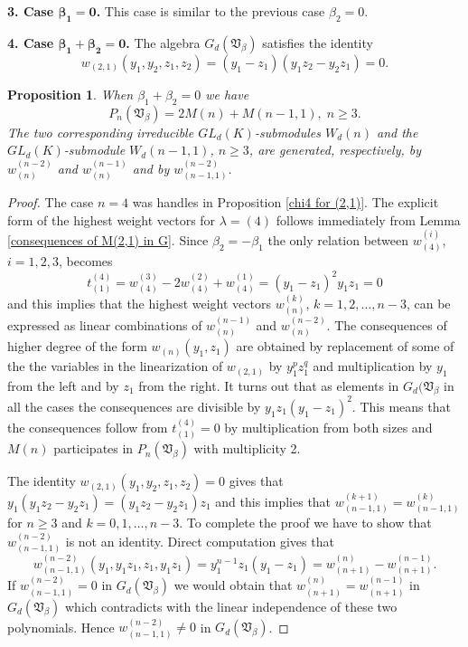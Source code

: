 \documentclass{amsart}
\newtheorem{proposition}[theorem]{Proposition}
\theoremstyle{definition}
\begin{document}
{\bf 3. Case $\bm{\beta_1=0}$.} This case is similar to the previous case $\beta_2=0$.

{\bf 4. Case $\bm{\beta_1+\beta_2=0}$.} The algebra $G_d({\mathfrak V}_{\beta})$ satisfies the identity
\[
w_{(2,1)}(y_1,y_2,z_1,z_2)=(y_1-z_1)(y_1z_2-y_2z_1)=0.
\]

\begin{proposition}\label{chi for beta1=beta2}
When $\beta_1+\beta_2=0$ we have
\[
P_n({\mathfrak V}_{\beta})=2M(n)+M(n-1,1),\; n\geq 3.
\]
The two corresponding irreducible $GL_d(K)$-submodules $W_d(n)$ and the $GL_d(K)$-submodule $W_d(n-1,1)$, $n\geq 3$, are generated, respectively, by
$w_{(n)}^{(n-2)}$ and $w_{(n)}^{(n-1)}$ and by $w_{(n-1,1)}^{(n-2)}$.
\end{proposition}

\begin{proof}
The case $n=4$ was handles in Proposition \ref{chi4 for (2,1)}. The explicit form of the highest weight vectors for $\lambda=(4)$ follows immediately
from Lemma \ref{consequences of M(2,1) in G}.
Since $\beta_2=-\beta_1$ the only relation between $w_{(4)}^{(i)}$, $i=1,2,3$, becomes
\[
t^{(4)}_{(1)}=w_{(4)}^{(3)}-2w_{(4)}^{(2)}+w_{(4)}^{(1)}=(y_1-z_1)^2y_1z_1=0
\]
and this implies that the highest weight vectors $w_{(n)}^{(k)}$, $k=1,2,\ldots,n-3$,
can be expressed as linear combinations of $w_{(n)}^{(n-1)}$ and $w_{(n)}^{(n-2)}$.
The consequences of higher degree of the form $w_{(n)}(y_1,z_1)$ are obtained by replacement of some of the the variables in the linearization of $w_{(2,1)}$
by $y_1^pz_1^q$ and multiplication by $y_1$ from the left and by $z_1$ from the right.
It turns out that as elements in $G_d({\mathfrak V}_{\beta}$ in all the cases the consequences are divisible by $y_1z_1(y_1-z_1)^2$. This means that the consequences follow from $t^{(4)}_{(1)}=0$
by multiplication from both sizes and $M(n)$ participates in $P_n({\mathfrak V}_{\beta})$ with multiplicity 2.

The identity $w_{(2,1)}(y_1,y_2,z_1,z_2)=0$ gives that $y_1(y_1z_2-y_2z_1)=(y_1z_2-y_2z_1)z_1$ and this implies that
$w_{(n-1,1)}^{(k+1)}=w_{(n-1,1)}^{(k)}$ for $n\geq 3$ and $k=0,1,\ldots,n-3$.
To complete the proof we have to show that $w_{(n-1,1)}^{(n-2)}$ is not an identity. Direct computation gives that
\[
w_{(n-1,1)}^{(n-2)}(y_1,y_1z_1,z_1,y_1z_1)=y_1^{n-1}z_1(y_1-z_1)=w_{(n+1)}^{(n)}-w_{(n+1)}^{(n-1)}.
\]
If $w_{(n-1,1)}^{(n-2)}=0$ in $G_d({\mathfrak V}_{\beta})$ we would obtain that $w_{(n+1)}^{(n)}=w_{(n+1)}^{(n-1)}$ in $G_d({\mathfrak V}_{\beta})$
which contradicts with the linear independence of these two polynomials. Hence $w_{(n-1,1)}^{(n-2)}\not=0$ in $G_d({\mathfrak V}_{\beta})$.
\end{proof}
\end{document}
